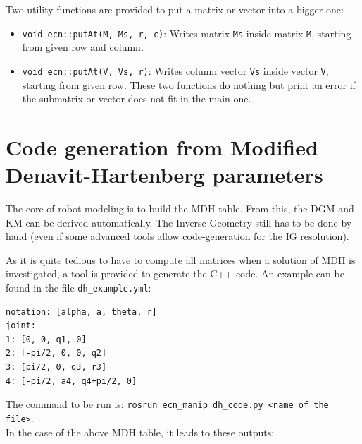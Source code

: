 \documentclass{ecnreport}
\begin{document}
Two utility functions are provided to put a matrix or vector into a bigger one:
\begin{itemize}
	\item \texttt{void ecn::putAt(M, Ms, r, c)}: Writes matrix \texttt{Ms} inside matrix \texttt{M}, starting from given row and column.
	\item \texttt{void ecn::putAt(V, Vs, r)}: Writes column vector \texttt{Vs} inside vector \texttt{V}, starting from given row. These two functions do nothing but print an error
	if the submatrix or vector does not fit in the main one.
\end{itemize}


\newpage
\section{Code generation from Modified Denavit-Hartenberg parameters}\label{dhcode}

The core of robot modeling is to build the MDH table. From this, the DGM and KM can be derived automatically. The Inverse Geometry still has to be done by hand (even if some advanced tools allow code-generation for the IG resolution).

As it is quite tedious to have to compute all matrices when a solution of MDH is investigated, a tool is provided to generate the C++ code. An example can be found in the file \texttt{dh\_example.yml}:
\cppstyle
\begin{lstlisting}
notation: [alpha, a, theta, r]
joint:
1: [0, 0, q1, 0]
2: [-pi/2, 0, 0, q2]
3: [pi/2, 0, q3, r3]
4: [-pi/2, a4, q4+pi/2, 0]
\end{lstlisting}
The command to be run is: \texttt{rosrun ecn\_manip dh\_code.py <name of the file>}.\\
In the case of the above MDH table, it leads to these outputs:
\end{document}
